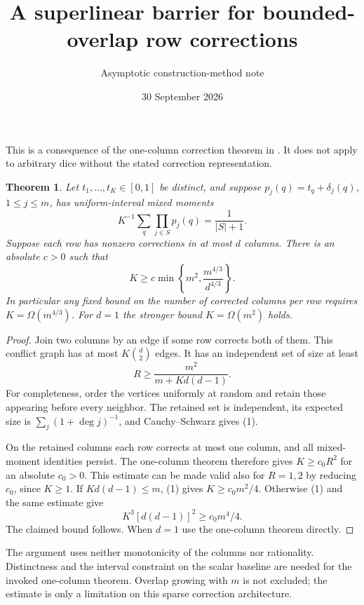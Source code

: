 \documentclass[11pt]{article}
\title{A superlinear barrier for bounded-overlap row corrections}
\author{Asymptotic construction-method note}
\date{30 September 2026}
\newtheorem{theorem}{Theorem}
\begin{document}
\maketitle
This is a consequence of the one-column correction theorem in
. It does not apply to arbitrary
dice without the stated correction representation.

\begin{theorem}
Let $t_1,\ldots,t_K\in[0,1]$ be distinct, and suppose
$p_j(q)=t_q+\delta_j(q)$, $1\le j\le m$, has uniform-interval mixed moments
\[
 K^{-1}\sum_q\prod_{j\in S}p_j(q)=\frac1{|S|+1}.
\]
Suppose each row has nonzero corrections in at most $d$ columns.
There is an absolute $c>0$ such that
\[
 K\ge c\min\left\{m^2,\frac{m^{4/3}}{d^{4/3}}\right\}.
\]
In particular any fixed bound on the number of corrected columns per
row requires $K=\Omega(m^{4/3})$. For $d=1$ the stronger bound
$K=\Omega(m^2)$ holds.
\end{theorem}
\begin{proof}
Join two columns by an edge if some row corrects both of them. This
conflict graph has at most $K\binom d2$ edges. It has an independent
set of size at least
\[
 R\ge\frac{m^2}{m+K d(d-1)}.
\tag{1}
\]
For completeness, order the vertices uniformly at random and retain
those appearing before every neighbor. The retained set is independent,
its expected size is $\sum_j(1+\deg j)^{-1}$, and Cauchy--Schwarz gives
(1).

On the retained columns each row corrects at most one column, and all
mixed-moment identities persist. The one-column theorem therefore gives
$K\ge c_0R^2$ for an absolute $c_0>0$. This estimate can be made valid
also for $R=1,2$ by reducing $c_0$, since $K\ge1$.
If $Kd(d-1)\le m$, (1) gives $K\ge c_0m^2/4$.
Otherwise (1) and the same estimate give
\[
 K^3[d(d-1)]^2\ge c_0m^4/4.
\]
The claimed bound follows. When $d=1$ use the one-column theorem directly.
\end{proof}

The argument uses neither monotonicity of the columns nor rationality.
Distinctness and the interval constraint on the scalar baseline are
needed for the invoked one-column theorem. Overlap growing with $m$
is not excluded; the estimate is only a limitation on this sparse
correction architecture.
\end{document}
